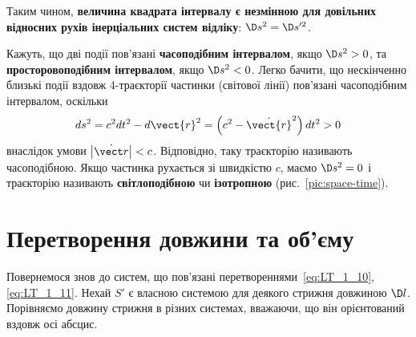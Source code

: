 Таким чином, \textbf{величина квадрата інтервалу є незмінною для довільних відносних рухів інерціальних систем відліку}:
$\D s^2=\D s'^2$.

Кажуть, що дві події пов'язані \textbf{часоподібним інтервалом}, якщо $\D s^2>0$, та \textbf{просторовоподібним
інтервалом}, якщо $ \D s^2<0 $. Легко бачити, що нескінченно близькі події вздовж 4-траєкторії частинки (світової
лінії) пов'язані часоподібним інтервалом, оскільки
\begin{equation*}
   ds^2=c^2dt^2-d\vect{r}^2=\left(c^2-\dot{\vect{r}}^2\right)dt^2>0
\end{equation*}
внаслідок умови $\left|\dot{{\vect r}}\right|<c$. Відповідно, таку траєкторію називають часоподібною. Якщо частинка
рухається зі швидкістю $c$, маємо $\D s^2=0$ і траєкторію називають \textbf{світлоподібною} чи \textbf{ізотропною}
(рис.~\ref{pic:space-time}).



\section{Перетворення довжини та об'єму}

Повернемося знов до систем, що пов'язані перетвореннями~\eqref{eq:LT_1_10}, \eqref{eq:LT_1_11}. Нехай $S'$ є власною
системою для деякого стрижня довжиною $\D l$. Порівняємо довжину стрижня в різних системах, вважаючи, що він
орієнтований вздовж осі абсцис.

